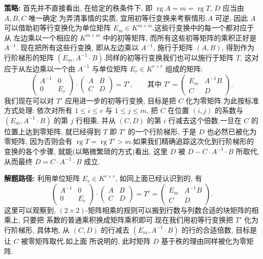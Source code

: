 \noindent\textbf{策略:} 首先并不直接看出, 在给定的秩条件下, 即 $\operatorname{rg} A = m = \operatorname{rg} T$,
$D$ 应当由 $A, B, C$ 唯一确定.为弄清事情的实质, 宜用初等行变换来考察情形.$A$ 可逆, 因此
$A$ 可以借助初等行变换化为单位矩阵 $E_m \in K^{m \times m}$.这些行变换中的每一个都对应于从
左边乘以一个相应的 $K^{m \times m}$ 中的初等矩阵, 而所有这些初等矩阵的乘积正好是 $A^{-1}$.
现在把所有这些行变换, 即从左边乘以 $A^{-1}$, 施行于矩阵 $(A, B)$, 得到作为行阶梯形的矩阵
$(E_m, A^{-1} \cdot B)$.同样的初等行变换我们也可以施行于矩阵 $T$, 这对应于从左边乘以一个由
$A^{-1}$ 与单位矩阵 $E_r \in K^{r \times r}$ 组成的矩阵:
\[
\begin{pmatrix} A^{-1} & 0 \\ 0 & E_r \end{pmatrix} \cdot \begin{pmatrix} A & B \\ C & D \end{pmatrix} = T', \qquad \text{其中 } T' = \begin{pmatrix} E_m & A^{-1}B \\ C & D \end{pmatrix}\text{.}
\]
我们现在可以对 $T'$ 应用进一步的初等行变换, 目标是把 $C$ 化为零矩阵.为此按标准方式处理:
依次对所有 $1 \leq i \leq r$ 与 $1 \leq j \leq m$, 把 $C$ 在位置 $(i, j)$ 的系数与
$(E_m, A^{-1} \cdot B)$ 的第 $j$ 行相乘, 并从 $(C, D)$ 的第 $i$ 行减去这个倍数.一旦在 $C$ 的
位置上达到零矩阵, 就已经得到 $T$ 即 $T'$ 的一个行阶梯形, 于是 $D$ 也必然已被化为零矩阵,
因为否则会有 $\operatorname{rg} T = \operatorname{rg} T' > m$.如果我们精确追踪这次化到行阶梯形的
变换的各个步骤, 就能(以略微繁琐的方式)看出, 这里 $D$ 被 $D - C \cdot A^{-1} \cdot B$ 所取代,
从而最终 $D = C \cdot A^{-1} \cdot B$ 成立.

\noindent\textbf{解题路径:} 利用单位矩阵 $E_r \in K^{r \times r}$, 如同上面已经认识到的, 有
\[
\begin{pmatrix} A^{-1} & 0 \\ 0 & E_r \end{pmatrix} \cdot \begin{pmatrix} A & B \\ C & D \end{pmatrix} = T' = \begin{pmatrix} E_m & A^{-1}B \\ C & D \end{pmatrix}\text{.}
\]
这里可以观察到, $(2 \times 2)$-矩阵相乘的规则可以搬到行数与列数合适的块矩阵的相乘上, 只要把
系数的普通乘积换成矩阵乘积即可.现在我们用初等行变换把 $T'$ 化为行阶梯形, 具体地, 从
$(C, D)$ 的行减去 $(E_m, A^{-1} \cdot B)$ 的行的合适倍数, 目标是让 $C$ 被零矩阵取代.如上面
所说明的, 此时矩阵 $D$ 基于秩的理由同样被化为零矩阵.

